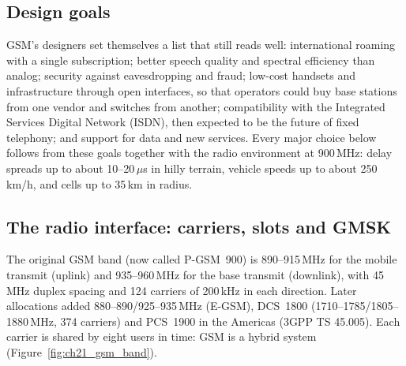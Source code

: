 
\subsection{Design goals}

GSM's designers set themselves a list that still reads well: international roaming with a single
subscription; better speech quality and spectral efficiency than analog; security against
eavesdropping and fraud; low-cost handsets and infrastructure through open interfaces, so that
operators could buy base stations from one vendor and switches from another; compatibility with the
Integrated Services Digital Network (ISDN), then expected to be the future of fixed telephony; and
support for data and new services. Every major choice below follows from these goals together with
the radio environment at 900\,MHz: delay spreads up to about 10--20\,$\mu$s in hilly terrain, vehicle
speeds up to about 250\,km/h, and cells up to 35\,km in radius.

\subsection{The radio interface: carriers, slots and GMSK}

The original GSM band (now called P-GSM~900) is 890--915\,MHz for the mobile transmit (uplink) and
935--960\,MHz for the base transmit (downlink), with 45\,MHz duplex spacing and 124 carriers of
200\,kHz in each direction. Later allocations added 880--890/925--935\,MHz (E-GSM), DCS~1800
(1710--1785/1805--1880\,MHz, 374 carriers) and PCS~1900 in the Americas (3GPP TS 45.005). Each
carrier is shared by eight users in time: GSM is a hybrid  system
(Figure~\ref{fig:ch21_gsm_band}).


